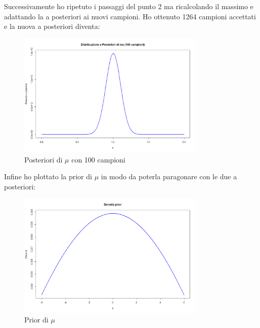 \documentclass[a4paper,12pt]{article}
\begin{document}
\begin{itemize}
	Successivamente ho ripetuto i passaggi del punto 2 ma ricalcolando il massimo e adattando la a posteriori ai nuovi campioni.
	Ho ottenuto 1264 campioni accettati e la nuova a posteriori diventa:
	\begin{figure}[h] %
		\centering %
		\includegraphics[width=0.8\textwidth]{newpost.png} %
		\caption{Posteriori di $\mu$ con 100 campioni} %
		\label{fig:immagine} %
	\end{figure}
	\newline
	Infine ho plottato la prior di $\mu$ in modo da poterla paragonare con le due a posteriori:
	\begin{figure}[h] %
		\centering %
		\includegraphics[width=0.8\textwidth]{prior.png} %
		\caption{Prior di $\mu$} %
		\label{fig:immagine} %
	\end{figure}

\end{itemize}
\end{document}
